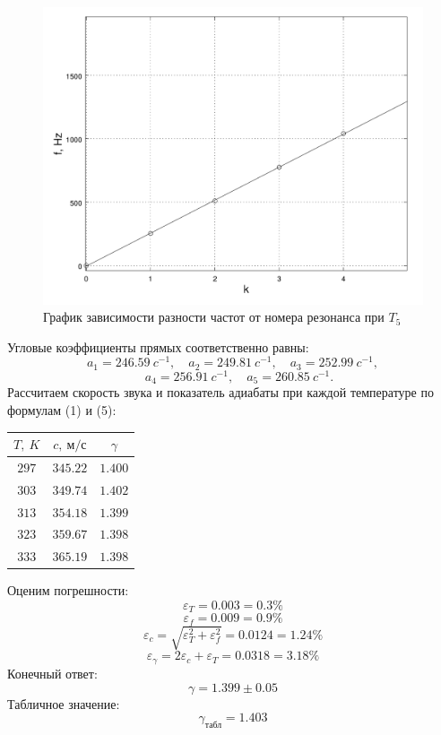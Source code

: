 \documentclass[20pt]{article}
\begin{document}
 \begin{figure}[H]
	\caption{График зависимости разности частот от номера резонанса при $T_5$}
	\center
	\includegraphics[scale=0.25]{T5.png}
\end{figure}

Угловые коэффициенты прямых соответственно равны:
\[
	a_1 = 246.59\ c^{-1}, \quad a_2 = 249.81\ c^{-1}, \quad a_3 = 252.99\ c^{-1}, 
\]
\[	
	\quad a_4 = 256.91\ c^{-1}, \quad a_5 = 260.85\ c^{-1}.
\]
Рассчитаем скорость звука и показатель адиабаты при каждой температуре по формулам (1) и (5):
\\
\begin{center}
\begin{tabular}{|c|c|c|}
\hline $T,\ K$ & $c,\ \text{м/с}$ & $\gamma$ \\\hline
$297$ & $345.22$ & $1.400$ \\\hline
$303$ & $349.74$ & $1.402$ \\\hline
$313$ & $354.18$ & $1.399$ \\\hline
$323$ & $359.67$ & $1.398$ \\\hline
$333$ & $365.19$ & $1.398$ \\\hline
\end{tabular}
\end{center}
Оценим погрешности:
\[
\varepsilon_{T} = 0.003 = 0.3\%
\]
\[
\varepsilon_{f} = 0.009 = 0.9\%
\]
\[
 \varepsilon_c = \sqrt{\varepsilon_{T}^2 + \varepsilon_{f}^2} = 0.0124 = 1.24\%
\]
\[
	\varepsilon_{\gamma} = 2 \varepsilon_c + \varepsilon_T = 0.0318 = 3.18\%
\]
Конечный ответ:
\[
	\gamma = 1.399 \pm 0.05
\]
Табличное значение:
\[
	\gamma_{\text{табл}} = 1.403
\]
\end{document}
